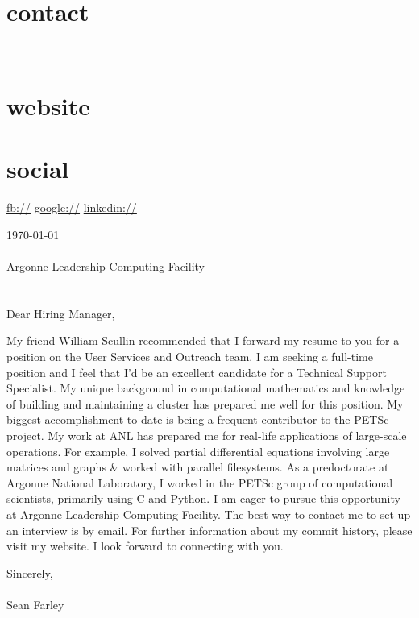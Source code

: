\documentclass[]{fancy-cv}
\begin{document}

\begin{aside}
  \section{contact}
    \href{mailto:\myemail}{\myemail}
    ~
    \myphone
    ~
    \myaddress
    \mycity
  \section{website}
    \href{\mywebsite}{\mywebsite}
  \section{social}
    \href{http://facebook.com/\myfb}{fb://\myfb}
    \href{http://plug.google.com/\mygp}{google://\mygp}
    \href{http://www.linkedin.com/in/\mylinkedin}{linkedin://\mylinkedin}
\end{aside}

\vspace{.8em}
\large
\today\\
\\
Argonne Leadership Computing Facility\\
\\
\\
Dear Hiring Manager,

My friend William Scullin recommended that I forward my resume to you for a
position on the User Services and Outreach team. I am seeking a full-time
position and I feel that I’d be an excellent candidate for a Technical Support
Specialist.
%
\newline\newline
%
My unique background in computational mathematics and knowledge of building and
maintaining a cluster has prepared me well for this position. My biggest
accomplishment to date is being a frequent contributor to the PETSc project.
%
\newline\newline
%
My work at ANL has prepared me for real-life applications of large-scale
operations. For example, I solved partial differential equations involving
large matrices and graphs \& worked with parallel filesystems. As a
predoctorate at Argonne National Laboratory, I worked in the PETSc group of
computational scientists, primarily using C and Python.
%
\newline\newline
%
I am eager to pursue this opportunity at Argonne Leadership Computing
Facility. The best way to contact me to set up an interview is by email. For
further information about my commit history, please visit my website. I look
forward to connecting with you.

\vspace{2em}
Sincerely,\\
\\
Sean Farley
\end{document}
